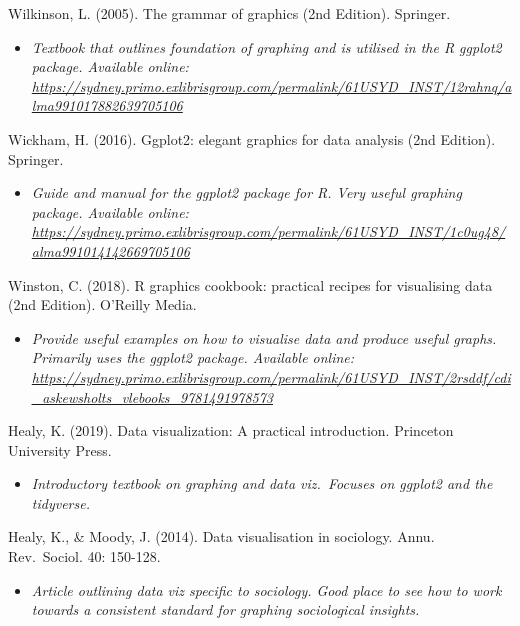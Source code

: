\documentclass[
]{book}
\providecommand{\tightlist}{%
  \setlength{\itemsep}{0pt}\setlength{\parskip}{0pt}}
\begin{document}
Wilkinson, L. (2005). The grammar of graphics (2nd Edition). Springer.

\begin{itemize}
\tightlist
\item
  \emph{Textbook that outlines foundation of graphing and is utilised in the R ggplot2 package. Available online: \url{https://sydney.primo.exlibrisgroup.com/permalink/61USYD_INST/12rahnq/alma991017882639705106} }
\end{itemize}

Wickham, H. (2016). Ggplot2: elegant graphics for data analysis (2nd Edition). Springer.

\begin{itemize}
\tightlist
\item
  \emph{Guide and manual for the ggplot2 package for R. Very useful graphing package. Available online: \url{https://sydney.primo.exlibrisgroup.com/permalink/61USYD_INST/1c0ug48/alma991014142669705106}}
\end{itemize}

Winston, C. (2018). R graphics cookbook: practical recipes for visualising data (2nd Edition). O'Reilly Media.

\begin{itemize}
\tightlist
\item
  \emph{Provide useful examples on how to visualise data and produce useful graphs. Primarily uses the ggplot2 package. Available online: \url{https://sydney.primo.exlibrisgroup.com/permalink/61USYD_INST/2rsddf/cdi_askewsholts_vlebooks_9781491978573}}
\end{itemize}

Healy, K. (2019). Data visualization: A practical introduction. Princeton University Press.

\begin{itemize}
\tightlist
\item
  \emph{Introductory textbook on graphing and data viz.~Focuses on ggplot2 and the tidyverse.}
\end{itemize}

Healy, K., \& Moody, J. (2014). Data visualisation in sociology. Annu. Rev.~Sociol. 40: 150-128.

\begin{itemize}
\tightlist
\item
  \emph{Article outlining data viz specific to sociology. Good place to see how to work towards a consistent standard for graphing sociological insights.}
\end{itemize}
\end{document}
